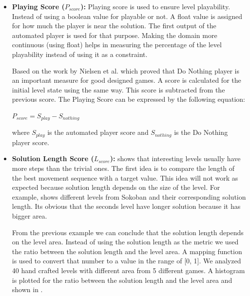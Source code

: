 \begin{itemize}
	\item \textbf{Playing Score ($P_{score}$):} Playing score is used to ensure level playability. Instead of using a boolean value for playable or not. A float value is assigned for how much the player is near the solution. The first output of the automated player is used for that purpose. Making the domain more continuous (using float) helps in measuring the percentage of the level playability instead of using it as a constraint.\\\par
	
	Based on the work by Nielsen et al.\cite{gvgpPerformanceProfiles} which proved that Do Nothing player is an important measure for good designed games. A score is calculated for the initial level state using the same way. This score is subtracted from the previous score. The Playing Score can be expressed by the following equation:
	\begin{center}$ P_{score} = S_{play} - S_{nothing}$\end{center}
	where $S_{play}$ is the automated player score and $S_{nothing}$ is the Do Nothing player score.
	
	\item\textbf{Solution Length Score ($L_{score}$):}  shows that interesting levels usually have more steps than the trivial ones. The first idea is to compare the length of the best movement sequence with a target value. This idea will not work as expected because solution length depends on the size of the level. For example,  shows different levels from Sokoban and their corresponding solution length. Its obvious that the seconds level have longer solution because it has bigger area.
	
	
	From the previous example we can conclude that the solution length depends on the level area. Instead of using the solution length as the metric we used the ratio between the solution length and the level area. A mapping function is used to convert that number to a value in the range of [0, 1]. We analyzed 40 hand crafted levels with different area from 5 different games. A histogram is plotted for the ratio between the solution length and the level area and shown in .
	

\end{itemize}
